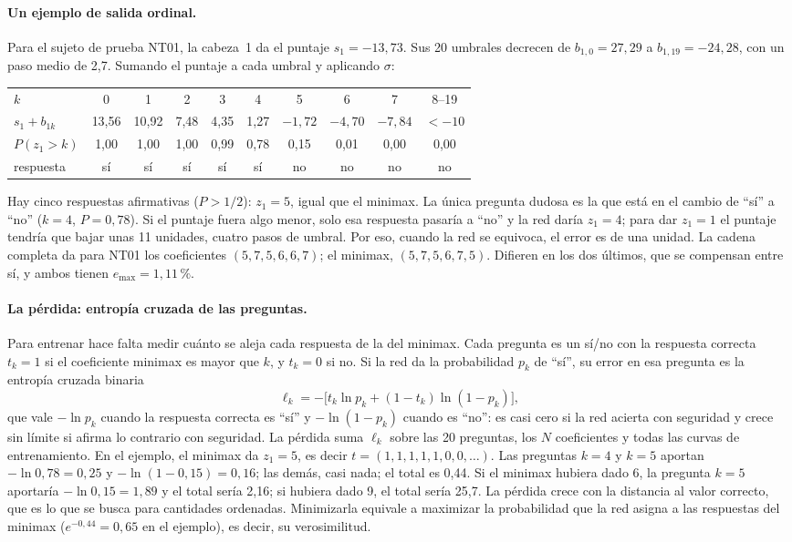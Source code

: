 \paragraph{Un ejemplo de salida ordinal.} Para el sujeto de prueba NT01, la cabeza~1 da el puntaje $s_1=-13{,}73$. Sus 20 umbrales decrecen de $b_{1,0}=27{,}29$ a $b_{1,19}=-24{,}28$, con un paso medio de 2,7. Sumando el puntaje a cada umbral y aplicando $\sigma$:
\begin{center}\small
\begin{tabular}{lccccccccc}
\hline
$k$ & 0 & 1 & 2 & 3 & 4 & 5 & 6 & 7 & 8--19\\
$s_1+b_{1k}$ & 13,56 & 10,92 & 7,48 & 4,35 & 1,27 & $-1{,}72$ & $-4{,}70$ & $-7{,}84$ & $<-10$\\
$P(z_1>k)$ & 1,00 & 1,00 & 1,00 & 0,99 & 0,78 & 0,15 & 0,01 & 0,00 & 0,00\\
respuesta & sí & sí & sí & sí & sí & no & no & no & no\\
\hline
\end{tabular}
\end{center}
Hay cinco respuestas afirmativas ($P>1/2$): $z_1=5$, igual que el minimax. La única pregunta dudosa es la que está en el cambio de ``sí'' a ``no'' ($k=4$, $P=0{,}78$). Si el puntaje fuera algo menor, solo esa respuesta pasaría a ``no'' y la red daría $z_1=4$; para dar $z_1=1$ el puntaje tendría que bajar unas 11 unidades, cuatro pasos de umbral. Por eso, cuando la red se equivoca, el error es de una unidad. La cadena completa da para NT01 los coeficientes $(5,7,5,6,6,7)$; el minimax, $(5,7,5,6,7,5)$. Difieren en los dos últimos, que se compensan entre sí, y ambos tienen $e_{\max}=1{,}11\,\%$.

\paragraph{La pérdida: entropía cruzada de las preguntas.} Para entrenar hace falta medir cuánto se aleja cada respuesta de la del minimax. Cada pregunta es un sí/no con la respuesta correcta $t_k=1$ si el coeficiente minimax es mayor que $k$, y $t_k=0$ si no. Si la red da la probabilidad $p_k$ de ``sí'', su error en esa pregunta es la entropía cruzada binaria
\[
\ell_k=-\bigl[t_k\ln p_k+(1-t_k)\ln(1-p_k)\bigr],
\]
que vale $-\ln p_k$ cuando la respuesta correcta es ``sí'' y $-\ln(1-p_k)$ cuando es ``no'': es casi cero si la red acierta con seguridad y crece sin límite si afirma lo contrario con seguridad. La pérdida suma $\ell_k$ sobre las 20 preguntas, los $N$ coeficientes y todas las curvas de entrenamiento. En el ejemplo, el minimax da $z_1=5$, es decir $t=(1,1,1,1,1,0,0,\ldots)$. Las preguntas $k=4$ y $k=5$ aportan $-\ln 0{,}78=0{,}25$ y $-\ln(1-0{,}15)=0{,}16$; las demás, casi nada; el total es 0,44. Si el minimax hubiera dado 6, la pregunta $k=5$ aportaría $-\ln 0{,}15=1{,}89$ y el total sería 2,16; si hubiera dado 9, el total sería 25,7. La pérdida crece con la distancia al valor correcto, que es lo que se busca para cantidades ordenadas. Minimizarla equivale a maximizar la probabilidad que la red asigna a las respuestas del minimax ($e^{-0{,}44}=0{,}65$ en el ejemplo), es decir, su verosimilitud.

